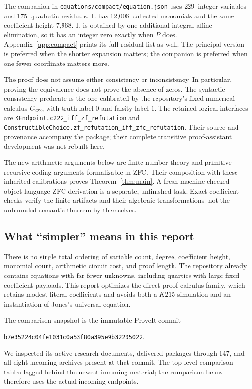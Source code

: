 \documentclass[11pt]{article}
\theoremstyle{remark}\newtheorem{remark}[theorem]{Remark}
\newcommand{\MainHeight}{7,968}
\newcommand{\CompactVars}{229}
\newcommand{\CompactRows}{175}
\newcommand{\CompactTerms}{12,006}
\begin{document}
The companion in \nolinkurl{equations/compact/equation.json} uses
\CompactVars\ integer variables and \CompactRows\ quadratic residuals.
It has \CompactTerms\ collected monomials and the same coefficient
height \MainHeight. It is obtained by one additional integral affine
elimination, so it has an integer zero exactly when $P$ does.
Appendix~\ref{app:compact} prints its full residual list as well.
The principal version is preferred when the shorter expansion matters;
the companion is preferred when one fewer coordinate matters more.

The proof does not assume either consistency or inconsistency. In
particular, proving the equivalence does not prove the absence of zeros.
The syntactic consistency predicate is the one calibrated by the
repository's fixed numerical calculus $C_{222}$, with truth label $0$
and falsity label $1$. The retained logical interfaces are
\nolinkurl{KEndpoint.c222_iff_zf_refutation} and
\nolinkurl{ConstructibleChoice.zf_refutation_iff_zfc_refutation}.
Their source and provenance accompany the package; their complete
transitive proof-assistant development was not rebuilt here.

The new arithmetic arguments below are finite number theory and
primitive recursive coding arguments formalizable in ZFC. Their
composition with these inherited calibrations proves
Theorem~\ref{thm:main}. A fresh machine-checked object-language ZFC
derivation is a separate, unfinished task. Exact coefficient checks
verify the finite artifacts and their algebraic transformations, not
the unbounded semantic theorem by themselves.

\subsection{What ``simpler'' means in this report}

There is no single total ordering of variable count, degree, coefficient
height, monomial count, arithmetic circuit cost, and proof length. The
repository already contains equations with far fewer unknowns, including
quartics with large fixed coefficient payloads. This report optimizes the
direct proof-calculus family, which retains modest literal coefficients
and avoids both a $K215$ simulation and an instantiation of Jones's
universal equation.

The comparison snapshot is the immutable ProveIt commit
\begin{center}\small
\texttt{b7e35224c04fe1031c0a53f80a395e9b32205022}.
\end{center}
We inspected its active research documents, delivered packages through
147, and all eight incoming archives present at that commit. The
top-level comparison tables lagged behind the newest incoming material;
the comparison below therefore uses the actual incoming endpoints.
\end{document}
